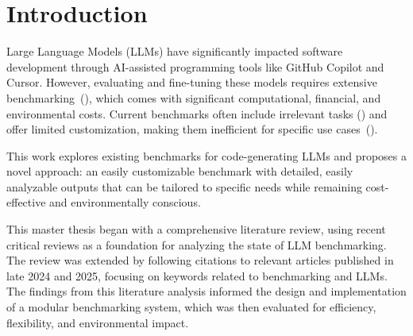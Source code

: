 
%
%



\section{Introduction}

Large Language Models (LLMs) have significantly impacted software development through AI-assisted programming tools like GitHub Copilot and Cursor.
However, evaluating and fine-tuning these models requires extensive benchmarking~(\cite{paul2024benchmarksmetricsevaluationscode}), which comes with significant computational, financial, and environmental costs.
Current benchmarks often include irrelevant tasks (\cite{vendrow2025largelanguagemodelbenchmarks}) and offer limited customization, making them inefficient for specific use cases~(\cite{yang2023intercodestandardizingbenchmarkinginteractive}).

This work explores existing benchmarks for code-generating LLMs and proposes a novel approach: an easily customizable benchmark with detailed, easily analyzable outputs that can be tailored to specific needs while remaining cost-effective and environmentally conscious.

This master thesis began with a comprehensive literature review, using recent critical reviews as a foundation for analyzing the state of LLM benchmarking.
The review was extended by following citations to relevant articles published in late 2024 and 2025, focusing on keywords related to benchmarking and LLMs.
The findings from this literature analysis informed the design and implementation of a modular benchmarking system, which was then evaluated for efficiency, flexibility, and environmental impact.

